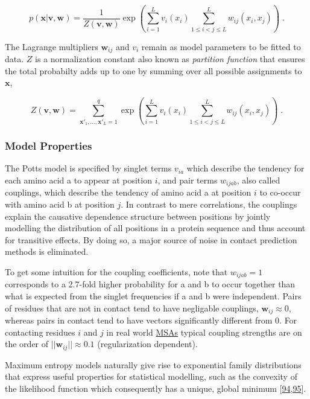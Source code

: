 \documentclass[11pt,a4paper,twoside]{book}
\newcommand{\seq}{\mathbf{x}}
\renewcommand{\v}{\mathbf{v}}
\newcommand{\vi}{v_{i}}
\newcommand{\via}{v_{ia}}
\newcommand{\w}{\mathbf{w}}
\newcommand{\wij}{\mathbf{w}_{ij}}
\newcommand{\wijab}{w_{ijab}}
\theoremstyle{definition}
\theoremstyle{definition}
\theoremstyle{remark}
\begin{document}
\begin{equation}
    p(\seq | \v, \w ) = \frac{1}{Z(\v, \w)} \exp \left( \sum_{i=1}^L v_i(x_i) \sum_{1 \leq i < j \leq L}^L w_{ij}(x_i, x_j) \right) \; .
\label{eq:max-ent-model}
\end{equation}

The Lagrange multipliers \(\wij\) and \(\vi\) remain as model parameters
to be fitted to data. \(Z\) is a normalization constant also known as
\emph{partition function} that ensures the total probabilty adds up to
one by summing over all possible assignments to \(\seq\),

\begin{equation}
  Z(\v, \w) = \sum_{\seq\prime_1, \ldots, \seq\prime_L = 1}^{q} \exp  \left( \sum_{i=1}^L v_i(x_i) \sum_{1 \leq i < j \leq L}^L w_{ij}(x_i, x_j) \right) \; .
  \label{eq:partition-fct-likelihood}
\end{equation}

\subsubsection{Model Properties}\label{potts-model-properties}

The Potts model is specified by singlet terms \(\via\) which describe
the tendency for each amino acid a to appear at position \(i\), and pair
terms \(\wijab\), also called couplings, which describe the tendency of
amino acid a at position \(i\) to co-occur with amino acid b at position
\(j\). In contrast to mere correlations, the couplings explain the
causative dependence structure between positions by jointly modelling
the distribution of all positions in a protein sequence and thus account
for transitive effects. By doing so, a major source of noise in contact
prediction methods is eliminated.

To get some intuition for the coupling coefficients, note that
\(\wijab = 1\) corresponds to a 2.7-fold higher probability for a and b
to occur together than what is expected from the singlet frequencies if
a and b were independent. Pairs of residues that are not in contact tend
to have negligable couplings, \(\wij \approx 0\), whereas pairs in
contact tend to have vectors significantly different from 0. For
contacting residues \(i\) and \(j\) in real world
\protect\hyperlink{abbrev}{MSAs} typical coupling strengths are on the
order of \(||\wij || \approx 0.1\) (regularization dependent).

Maximum entropy models naturally give rise to exponential family
distributions that express useful properties for statistical modelling,
such as the convexity of the likelihood function which consequently has
a unique, global minimum
{[}\protect\hyperlink{ref-Wainwright2007}{94},\protect\hyperlink{ref-Murphy2012}{95}{]}.
\end{document}
